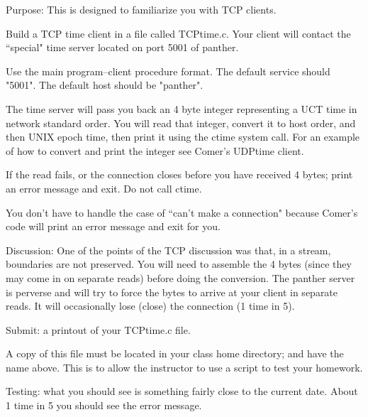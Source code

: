 

\parindent 0pt

Purpose: This is designed to familiarize you with TCP clients.

Build a TCP time client in a file called {\ltt{}TCPtime.c}.
Your client will contact the ``special" time server located
on port 5001 of panther.

Use the main program--client procedure format.
The default service should {\ltt{}"5001"}.
The default host should be {\ltt{}"panther"}.

The time server will pass you back an 4 byte integer representing a 
UCT time in network standard order.
You will read that integer, convert it to host order,
and then UNIX epoch time,
then print it using the {\ltt{}ctime} system call.
For an example of how to convert and print the integer
see Comer's {\ltt{}UDPtime} client.

If the read fails, or the connection closes before you have
received 4 bytes; print an error message and exit.
Do not call {\ltt{}ctime}.

You don't have to handle the case of ``can't make a connection"
because Comer's code will print an error message and exit for you.

Discussion:
One of the points of the TCP discussion was that, in a stream,
boundaries are not preserved.
You will need to assemble the 4 bytes (since they may come in on
separate reads)
before doing the conversion.
The {\ltt{}panther} server is perverse and will try to force
the bytes to arrive at your client in separate reads.
It will occasionally lose (close) the connection (1 time in 5).

Submit: a printout of your {\ltt{}TCPtime.c} file.

A copy of this file must be located in your class home directory;
and have the name above.
This is to allow the instructor to use a script to test your homework.

Testing: what you should see is something fairly close to
the current date.
About 1 time in 5 you should see the error message.

\bye
